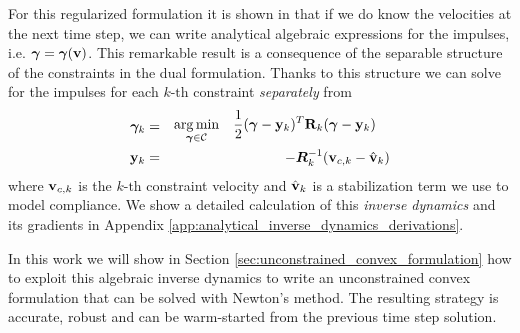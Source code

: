 For this regularized formulation it is shown in \cite{bib:todorov2014} that if
we do know the velocities at the next time step, we can write analytical
algebraic expressions for the impulses, i.e. ${\bm\gamma} = {\bm\gamma}({\mathbf{v}})$. This
remarkable result is a consequence of the separable structure of the constraints
in the dual formulation. Thanks to this structure we can solve for the impulses
for each $k\text{-th}$ constraint \textit{separately} from
\begin{eqnarray}
	{\bm\gamma}_k&=&
	\begin{aligned}
		\operatorname*{arg\,min}_{{\bm\gamma}\in\mathcal{C}} \quad &
	\frac{1}{2}({\bm\gamma}-{\mathbf{y}}_k)^T{\mathbf{R}}_k({\bm\gamma}-{\mathbf{y}}_k) \end{aligned}\\
	{\mathbf{y}}_k &=& -{\bm{R}}_k^{-1}({\mathbf{v}}_{c,k}-\hat{{\mathbf{v}}}_k)
\end{eqnarray}
where ${\mathbf{v}}_{c,k}$ is the $k\text{-th}$ constraint velocity and
$\hat{{\mathbf{v}}}_k$ is a stabilization term we use to model compliance. We show a
detailed calculation of this \textit{inverse dynamics} and its gradients in
Appendix \ref{app:analytical_inverse_dynamics_derivations}.

In this work we will show in Section \ref{sec:unconstrained_convex_formulation}
how to exploit this algebraic inverse dynamics to write an unconstrained convex
formulation that can be solved with Newton's method. The resulting strategy is
accurate, robust and can be warm-started from the previous time step solution.
